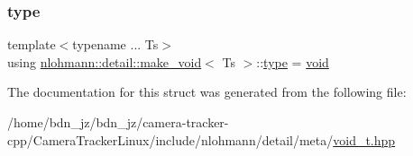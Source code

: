 \subsubsection{\texorpdfstring{type}{type}}
{\footnotesize\ttfamily template$<$typename ... Ts$>$ \\
using \hyperlink{structnlohmann_1_1detail_1_1make__void}{nlohmann\+::detail\+::make\+\_\+void}$<$ Ts $>$\+::\hyperlink{structnlohmann_1_1detail_1_1make__void_a8961e24ae3b2cb65ec47d1ce805d94e4}{type} =  \hyperlink{namespacenlohmann_1_1detail_a59fca69799f6b9e366710cb9043aa77d}{void}}



The documentation for this struct was generated from the following file\+:\begin{DoxyCompactItemize}
\item 
/home/bdn\+\_\+jz/bdn\+\_\+jz/camera-\/tracker-\/cpp/\+Camera\+Tracker\+Linux/include/nlohmann/detail/meta/\hyperlink{void__t_8hpp}{void\+\_\+t.\+hpp}\end{DoxyCompactItemize}
